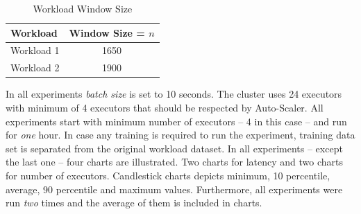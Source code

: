 \begin{table}[h]
    \begin{tabular}{lc}
        \toprule
        \textbf{Workload} & \textbf{Window Size = $n$ }\\
        \midrule
        Workload 1 & 1650\\
        Workload 2 & 1900\\
        \bottomrule
    \end{tabular}
    \centering
    \caption{Workload Window Size}
    \label{eval:tab:history}
\end{table}

In all experiments \emph{batch size} is set to 10 seconds. The cluster uses 24 executors with minimum of 4 executors that should be respected by Auto-Scaler. All experiments start with minimum number of executors -- 4 in this case -- and run for \emph{one} hour. In case any training is required to run the experiment, training data set is separated from the original workload dataset. In all experiments -- except the last one -- four charts are illustrated. Two charts for latency and two charts for number of executors. Candlestick charts depicts minimum, 10 percentile, average, 90 percentile and maximum values. Furthermore, all experiments were run \emph{two} times and the average of them is included in charts.

\clearpage
